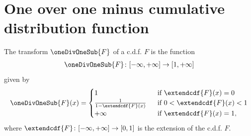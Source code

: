 \section{One over one minus cumulative distribution function}

\begin{definition}
  \label{def:one-div-one-sub-cdf}
  \leanok
  The transform $\oneDivOneSub{F}$ of a c.d.f. $F$ is the function
  \begin{align*}
    \oneDivOneSub{F} \colon [-\infty,+\infty] \to [1,+\infty]
  \end{align*}
  given by
  \begin{align*}
    \oneDivOneSub{F}(x) = \begin{cases}
      1 & \; \text{ if } \extendcdf{F}(x) = 0 \\
      \frac{1}{1-\extendcdf{F}(x)} & \; \text{ if } 0 < \extendcdf{F}(x) < 1 \\
      +\infty & \; \text{ if } \extendcdf{F}(x) = 1 ,
      \end{cases}
  \end{align*}
  where $\extendcdf{F} \colon [-\infty,+\infty] \to [0,1]$ is the extension of the c.d.f. $F$.
\end{definition}

